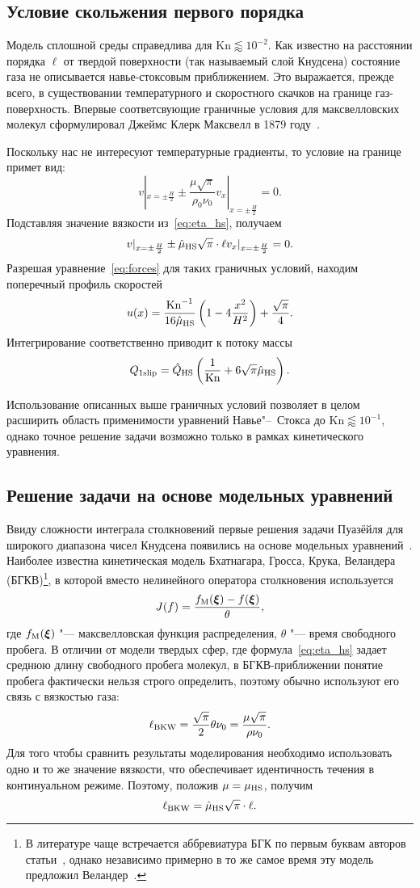 \documentclass[a4paper,12pt]{article}
\newcommand{\Kn}{\mathrm{Kn}}
\newcommand{\muHS}{\hat{\mu}_{\rm{HS}}}
\newcommand{\QHS}{\hat{Q}_{\rm{HS}}}
\begin{document}
\subsection{Условие скольжения первого порядка}

Модель сплошной среды справедлива для \(\Kn\lessapprox10^{-2}\).
Как известно на расстоянии порядка \(\ell\) от твердой поверхности (так называемый слой Кнудсена)
состояние газа не описывается навье-стоксовым приближением.
Это выражается, прежде всего, в существовании температурного и скоростного скачков на границе газ-поверхность.
Впервые соответсвующие граничные условия для максвелловских молекул сформулировал
Джеймс Клерк Максвелл в 1879 году~\cite{Maxwell1879}.

Поскольку нас не интересуют температурные градиенты, то условие на границе примет вид:
\[ v|_{x=\pm\frac{H}{2}} \pm \frac{\mu\sqrt{\pi}}{\rho_0\nu_0}v_x|_{x=\pm\frac{H}{2}} = 0. \]
Подставляя значение вязкости из~\eqref{eq:eta_hs}, получаем
\[ v|_{x=\pm\frac{H}{2}} \pm \muHS\sqrt{\pi}\cdot\ell v_x|_{x=\pm\frac{H}{2}} = 0. \]
Разрешая уравнение~\eqref{eq:forces} для таких граничных условий, находим поперечный профиль скоростей
\[ u(x) = \frac{\Kn^{-1}}{16\muHS} \left(1-4\frac{x^2}{H^2}\right) + \frac{\sqrt{\pi}}{4}. \]
Интегрирование соответственно приводит к потоку массы
\[ Q_{1\text{slip}} = \QHS\left(\frac1{\Kn} + 6\sqrt{\pi}\muHS \right). \]

Использование описанных выше граничных условий позволяет в целом расширить область применимости
уравнений Навье"--~Стокса до \(\Kn\lessapprox10^{-1}\), однако точное решение задачи возможно
только в рамках кинетического уравнения.

\subsection{Решение задачи на основе модельных уравнений}

Ввиду сложности интеграла столкновений первые решения задачи Пуазёйля для широкого диапазона чисел Кнудсена
появились на основе модельных уравнений~\cite{Cercignani1963}.
Наиболее известна кинетическая модель Бхатнагара, Гросса, Крука, Веландера (БГКВ)\footnote
{
	В литературе чаще встречается аббревиатура БГК по первым буквам авторов статьи~\cite{Bhatnagar1954},
	однако независимо примерно в то же самое время эту модель предложил Веландер~\cite{Welander1954}.
},
в которой вместо нелинейного оператора столкновения используется
\[ J(f) = \frac{f_{\rm{M}}(\boldsymbol\xi) - f(\boldsymbol\xi)}{\theta}, \]
где \(f_{\rm{M}}(\boldsymbol\xi)\) "--- максвелловская функция распределения, \(\theta\) "--- время свободного пробега.
В отличии от модели твердых сфер, где формула~\eqref{eq:eta_hs} задает среднюю длину свободного пробега молекул,
в БГКВ-приближении понятие пробега фактически нельзя строго определить,
поэтому обычно используют его связь с вязкостью газа:
\[ \ell_{\rm{BKW}} = \frac{\sqrt{\pi}}{2}\theta\nu_0 = \frac{\mu\sqrt{\pi}}{\rho\nu_0}. \]
Для того чтобы сравнить результаты моделирования необходимо использовать одно и то же значение вязкости,
что обеспечивает идентичность течения в континуальном режиме.
Поэтому, положив \(\mu = \mu_{\rm{HS}}\), получим
\[ \ell_{\rm{BKW}} = \muHS\sqrt{\pi}\cdot\ell. \]
\end{document}
